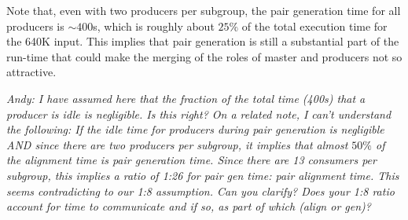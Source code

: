 \documentclass[10pt,journal,letterpaper,compsoc]{IEEEtran}
\begin{document}
Note that, even with two producers per subgroup, the pair generation time for all producers is $\sim$$400$s, which is roughly about $25\%$ of the total execution time for the 640K input. This implies that pair generation is still a substantial part of the run-time that could make the merging of the roles of master and producers not so attractive.

{\it Andy: I have assumed here that the fraction of the total time (400s) that a producer is idle is negligible. Is this right? On a related note, I can't understand the following: If the idle time for producers during pair generation is negligible AND since there are two producers per subgroup, it implies that almost $50\%$ of the alignment time is pair generation time. Since there are 13 consumers per subgroup, this implies a ratio of 1:26 for pair gen time: pair alignment time. This seems contradicting to our 1:8 assumption. Can you clarify? Does your 1:8 ratio account for time to communicate and if so, as part of which (align or gen)?}
\end{document}
